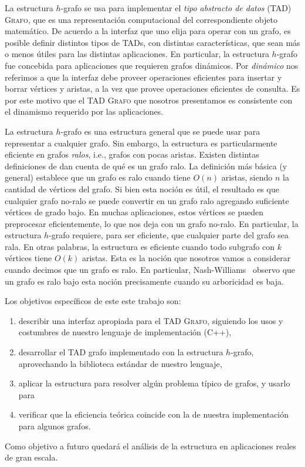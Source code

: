 \documentclass[%
    a4paper,%
    fontsize=12pt,%
    DIV=12,
    twoside,%
    openright,%
    titlepage=true,%
    headsepline,%
    toc=bibliography,%
    parskip=half,%
    cleardoublepage=empty,%
    headings=big,%
]{scrbook}
\newcommand{\Grafo}{\textsc{Grafo}\xspace}
\DeclareRobustCommand{\CPP}{C\nolinebreak[4]\hspace{-.05em}\raisebox{.4ex}{\relsize{-3}\textbf{++}}\xspace}
\def\CPP{C++}%
\begin{document}
La estructura $h$-grafo se usa para implementar el \emph{tipo abstracto de datos} (TAD) \Grafo, que es una representación computacional del correspondiente objeto matemático.  De acuerdo a la interfaz que uno elija para operar con un grafo, es posible definir distintos tipos de TADs, con distintas características, que sean más o menos útiles para las distintas aplicaciones.  En particular, la estructura $h$-grafo fue concebida para aplicaciones que requieren grafos dinámicos.  Por \emph{dinámico} nos referimos a que la interfaz debe proveer operaciones eficientes para insertar y borrar vértices y aristas, a la vez que provee operaciones eficientes de consulta.  Es por este motivo que el TAD \Grafo que nosotros presentamos es consistente con el dinamismo requerido por las aplicaciones.  

La estructura $h$-grafo es una estructura general que se puede usar para representar a cualquier grafo.  Sin embargo, la estructura es particularmente eficiente en grafos \emph{ralos}, i.e., grafos con pocas aristas.  Existen distintas definiciones de dan cuenta de qué es un grafo ralo.  La definición más básica (y general) establece que un grafo es ralo cuando tiene $O(n)$ aristas, siendo $n$ la cantidad de vértices del grafo.  Si bien esta noción es útil, el resultado es que cualquier grafo no-ralo se puede convertir en un grafo ralo agregando suficiente vértices de grado bajo.  En muchas aplicaciones, estos vértices se pueden preprocesar eficientemente, lo que nos deja con un grafo no-ralo.  En particular, la estructura $h$-grafo requiere, para ser eficiente, que cualquier parte del grafo sea rala.  En otras palabras, la estructura es eficiente cuando todo subgrafo con $k$ vértices tiene $O(k)$ aristas.  Esta es la noción que nosotros vamos a considerar cuando decimos que un grafo es ralo.  En particular, Nash-Williams~\cite{Nash-WilliamsJLMS1964} observo que un grafo es ralo bajo esta noción precisamente cuando su arboricidad es baja.

Los objetivos específicos de este este trabajo son:
\begin{enumerate}
  \item describir una interfaz apropiada para el TAD \Grafo, siguiendo los usos y costumbres de nuestro lenguaje de implementación (\CPP),
  \item desarrollar el TAD grafo implementado con la estructura $h$-grafo, aprovechando la biblioteca estándar de nuestro lenguaje,
  \item aplicar la estructura para resolver algún problema típico de grafos, y usarlo para
  \item verificar que la eficiencia teórica coincide con la de nuestra implementación para algunos grafos.
\end{enumerate}
Como objetivo a futuro quedará el análisis de la estructura en aplicaciones reales de gran escala.
\end{document}
